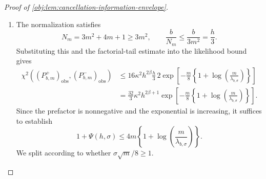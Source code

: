 \documentclass[11pt]{article}
\begin{document}
\begin{proof}[Proof of \cref{obj:lem:cancellation-information-envelope}]
\begin{enumerate}
To calibrate this exponent, use
\[
\frac{m}{\lambda_{b,\sigma}}\ge256,
\qquad
\log\!\left(\frac{m}{\lambda_{b,\sigma}}\right)\ge8\log2,
\qquad
\log2\ge1-\frac12=\frac12.
\]
Monotonicity of the logarithm and \(J_m\ge m/2\) imply
\[
\log\!\left(\frac{J_m}{\mathrm e\,\lambda_{b,\sigma}}\right)
\ge
\log\!\left(\frac{m}{\lambda_{b,\sigma}}\right)-\log2-1
\ge7\log2-1\ge0.
\]
Hence
\[
\begin{aligned}
&J_m\log\!\left(\frac{J_m}{\mathrm e\,\lambda_{b,\sigma}}\right)
-\frac{\lambda_{b,\sigma}}6\\
&\qquad\ge
\frac m2\left\{
\log\!\left(\frac{m}{\lambda_{b,\sigma}}\right)-\log2-1
\right\}-\frac m{1536}\\
&\qquad\ge
\frac m8\left\{1+\log\!\left(\frac{m}{\lambda_{b,\sigma}}\right)\right\}.
\end{aligned}
\]
For the last inequality, the difference between its two sides, divided by \(m\), is
\[
\begin{aligned}
&\frac38\log\!\left(\frac{m}{\lambda_{b,\sigma}}\right)
-\frac12\log2-\frac58-\frac1{1536}\\
&\qquad\ge
\frac52\log2-\frac58-\frac1{1536}
\ge\frac58-\frac1{1536}>0.
\end{aligned}
\]
Combining the preceding estimates gives
\[
\begin{aligned}
\exp\!\left(\frac{\lambda_{b,\sigma}}6\right)
\sum_{j=m-1}^{\infty}\frac{\lambda_{b,\sigma}^{\,j}}{j!}
&\le
2\exp\!\left[
\frac{\lambda_{b,\sigma}}6
-J_m\log\!\left(\frac{J_m}{\mathrm e\,\lambda_{b,\sigma}}\right)
\right]\\
&\le
2\exp\!\left[
-\frac m8\left\{1+\log\!\left(\frac{m}{\lambda_{b,\sigma}}\right)\right\}
\right].
\end{aligned}
\]

\item The normalization satisfies
\[
N_m=3m^2+4m+1\ge3m^2,
\qquad
\frac{b}{N_m}\le\frac{b}{3m^2}=\frac h3.
\]
Substituting this and the factorial-tail estimate into the likelihood bound gives
\[
\begin{aligned}
\chi^2\!\left((P^+_{b,m})_{\mathrm{obs}},
             (P^-_{b,m})_{\mathrm{obs}}\right)
&\le
16\kappa^2h^{2\beta}\frac h3\,
2\exp\!\left[
-\frac m8\left\{1+\log\!\left(\frac{m}{\lambda_{b,\sigma}}\right)\right\}
\right]\\
&=
\frac{32}{3}\kappa^2h^{2\beta+1}
\exp\!\left[
-\frac m8\left\{1+\log\!\left(\frac{m}{\lambda_{b,\sigma}}\right)\right\}
\right].
\end{aligned}
\]
Since the prefactor is nonnegative and the exponential is increasing, it suffices to establish
\[
1+\Psi(h,\sigma)
\le
4m\left\{1+\log\!\left(\frac{m}{\lambda_{b,\sigma}}\right)\right\}.
\]
We split according to whether \(\sigma\sqrt m/8\ge1\).


\end{enumerate}
\end{proof}
\end{document}
